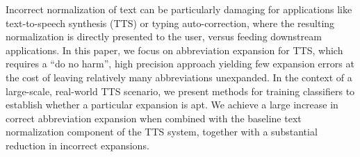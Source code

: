 Incorrect normalization of text can be particularly damaging for applications like text-to-speech synthesis (TTS) or typing auto-correction, where the resulting normalization is directly presented to the user, versus feeding downstream applications.  In this paper, we focus on abbreviation expansion for TTS, which requires a ``do no harm'', high precision approach yielding few expansion errors at the cost of leaving relatively many abbreviations unexpanded. In the context of a large-scale, real-world TTS scenario, we present methods for training classifiers to establish whether a particular expansion is apt.  We achieve a large increase in correct abbreviation expansion when combined with the baseline text normalization component of the TTS system, together with a substantial reduction in incorrect expansions.

